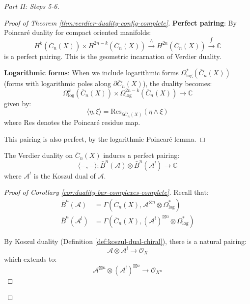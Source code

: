 \begin{proof}[Part II: Steps 5-6]
\begin{proof}[Proof of Theorem \ref{thm:verdier-duality-config-complete}]
\textbf{Perfect pairing}: By Poincaré duality for compact oriented manifolds:
\begin{equation}
H^k(\overline{C}_n(X)) \times H^{2n-k}(\overline{C}_n(X)) \xrightarrow{\wedge} 
H^{2n}(\overline{C}_n(X)) \xrightarrow{\int} \mathbb{C}
\end{equation}
is a perfect pairing. This is the geometric incarnation of Verdier duality.

\textbf{Logarithmic forms}: When we include logarithmic forms $\Omega^*_{\log}(
\overline{C}_n(X))$ (forms with logarithmic poles along $\partial \overline{C}_n(X)$), 
the duality becomes:
\begin{equation}
\Omega^k_{\log}(\overline{C}_n(X)) \times \Omega^{2n-k}_{\log}(\overline{C}_n(X)) 
\to \mathbb{C}
\end{equation}
given by:
\begin{equation}
\langle \eta, \xi \rangle = \text{Res}_{\partial \overline{C}_n(X)} (\eta \wedge \xi)
\end{equation}
where $\text{Res}$ denotes the Poincaré residue map.

This pairing is also perfect, by the logarithmic Poincaré lemma.
\end{proof}

\begin{corollary}
\label{cor:duality-bar-complexes-complete}
The Verdier duality on $\overline{C}_n(X)$ induces a perfect pairing:
\begin{equation}
\langle -, - \rangle: \bar{B}^n(\mathcal{A}) \otimes \bar{B}^n(\mathcal{A}^!) \to 
\mathbb{C}
\end{equation}
where $\mathcal{A}^!$ is the Koszul dual of $\mathcal{A}$.
\end{corollary}

\begin{proof}[Proof of Corollary \ref{cor:duality-bar-complexes-complete}]
Recall that:
\begin{align}
\bar{B}^n(\mathcal{A}) &= \Gamma(\overline{C}_n(X), \mathcal{A}^{\boxtimes n} \otimes 
\Omega^*_{\log})\\
\bar{B}^n(\mathcal{A}^!) &= \Gamma(\overline{C}_n(X), (\mathcal{A}^!)^{\boxtimes n} 
\otimes \Omega^*_{\log})
\end{align}

By Koszul duality (Definition \ref{def:koszul-dual-chiral}), there is a natural pairing:
\begin{equation}
\mathcal{A} \otimes \mathcal{A}^! \to \mathcal{O}_X
\end{equation}
which extends to:
\begin{equation}
\mathcal{A}^{\boxtimes n} \otimes (\mathcal{A}^!)^{\boxtimes n} \to \mathcal{O}_{X^n}
\end{equation}


\end{proof}
\end{proof}

